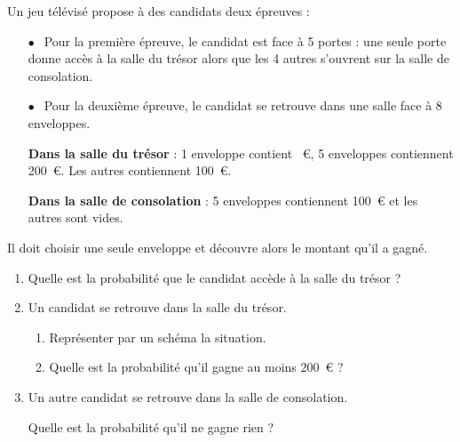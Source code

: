 
Un jeu télévisé propose à des candidats deux épreuves :

\begin{itemize}
\item[$\bullet~~$]Pour la première épreuve, le candidat est face à 5 portes : une seule
porte donne accès à la salle du trésor alors que les 4 autres s'ouvrent
sur la salle de consolation.
\item[$\bullet~~$]Pour la deuxième épreuve, le candidat se retrouve dans une salle face
à 8 enveloppes.

\textbf{Dans la salle du trésor }: 1 enveloppe contient ~\euro, 5 enveloppes
contiennent 200~\euro. Les autres contiennent 100~\euro.

\textbf{Dans la salle de consolation} : 5 enveloppes contiennent 100~\euro{} et les
autres sont vides.
\end{itemize}


Il doit choisir une seule enveloppe et découvre alors le montant qu'il a gagné.

\medskip

\begin{enumerate}
\item Quelle est la probabilité que le candidat accède à la salle du trésor ?
\item Un candidat se retrouve dans la salle du trésor.
	\begin{enumerate}
		\item Représenter par un schéma la situation.
		\item Quelle est la probabilité qu'il gagne au moins 200~\euro{} ?
	\end{enumerate}
\item Un autre candidat se retrouve dans la salle de consolation.

Quelle est la probabilité qu'il ne gagne rien ?
\end{enumerate}